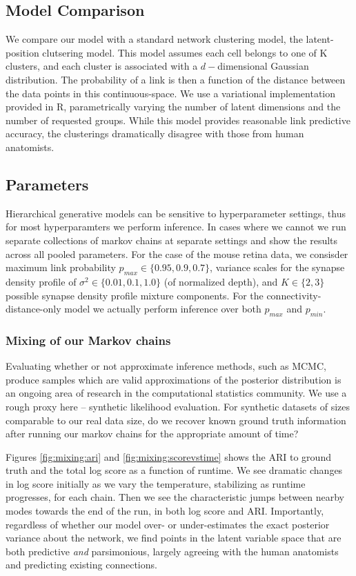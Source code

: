 \documentclass{article}
\begin{document}
\subsection{Model Comparison}
We compare our model with a standard network clustering model, the
latent-position clutsering model. This model assumes each cell belongs
to one of K clusters, and each cluster is associated with a
$d-$dimensional Gaussian distribution. The probability of a link is
then a function of the distance between the data points in this
continuous-space. We use \autocite{VBLPCM} a variational
implementation provided in R, parametrically varying the number of
latent dimensions and the number of requested groups.  While this
model provides reasonable link predictive accuracy, the clusterings
dramatically disagree with those from human anatomists.


\subsection{Parameters}

Hierarchical generative models can be sensitive to hyperparameter
settings, thus for most hyperparamters we perform inference. In cases
where we cannot we run separate collections of markov chains at
separate settings and show the results across all pooled
parameters. For the case of the mouse retina data, we consisder
maximum link probability $p_{max} \in \{0.95, 0.9, 0.7\}$, variance
scales for the synapse density profile of $\sigma^2 \in \{0.01, 0.1,
1.0\}$ (of normalized depth), and $K \in \{2, 3\}$ possible synapse
density profile mixture components. For the connectivity-distance-only
model we actually perform inference over both $p_{max}$ and $p_{min}$.


\subsubsection{Mixing of our Markov chains} 
Evaluating whether or not approximate inference methods, such as MCMC,
produce samples which are valid approximations of the posterior
distribution is an ongoing area of research in the computational
statistics community. We use a rough proxy here -- synthetic
likelihood evaluation.  For synthetic datasets of sizes comparable to
our real data size, do we recover known ground truth information after
running our markov chains for the appropriate amount of time?

Figures \ref{fig:mixing:ari} and \ref{fig:mixing:scorevstime} shows
the ARI to ground truth and the total log score as a function of
runtime.  We see dramatic changes in log score initially as we vary
the temperature, stabilizing as runtime progresses, for each
chain. Then we see the characteristic jumps between nearby modes
towards the end of the run, in both log score and ARI.  Importantly,
regardless of whether our model over- or under-estimates the exact
posterior variance about the network, we find points in the latent
variable space that are both predictive \textit{and} parsimonious,
largely agreeing with the human anatomists and predicting existing
connections.
\end{document}
